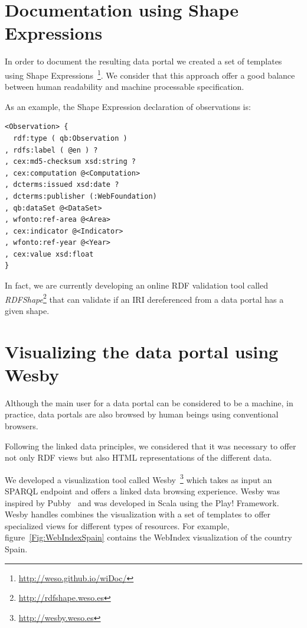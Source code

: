 \documentclass{acm_proc_article-sp}
\begin{document}
\section{Documentation using Shape Expressions}

In order to document the resulting data portal we created a set of templates using Shape Expressions~\footnote{\url{http://weso.github.io/wiDoc/}}. We consider that this approach offer a good balance between human readability and machine processable specification. 

As an example, the Shape Expression declaration of observations is:

\begin{lstlisting}
<Observation> { 
  rdf:type ( qb:Observation )  
, rdfs:label ( @en ) ?
, cex:md5-checksum xsd:string ?
, cex:computation @<Computation> 
, dcterms:issued xsd:date ?
, dcterms:publisher (:WebFoundation) 
, qb:dataSet @<DataSet>
, wfonto:ref-area @<Area>
, cex:indicator @<Indicator> 
, wfonto:ref-year @<Year>
, cex:value xsd:float              
}
\end{lstlisting}

In fact, we are currently developing an online RDF validation tool called \emph{RDFShape}\footnote{\url{http://rdfshape.weso.es}} that can validate if an IRI dereferenced from a data portal has a given shape.

\section{Visualizing the data portal using Wesby}

Although the main user for a data portal can be considered to be a machine, in practice, data portals are also browsed by human beings using conventional browsers. 

Following the linked data principles, we considered that it was necessary to offer not only RDF views but also HTML representations of the different data.

We developed a visualization tool called Wesby~\footnote{\url{http://wesby.weso.es}} which takes as input an SPARQL endpoint and offers a linked data browsing experience. Wesby was inspired by Pubby~\cite{Pubby} and was developed in Scala using the Play! Framework. 
Wesby handles combines the visualization with a set of templates to offer specialized views for different
 types of resources. For example, figure~\ref{Fig:WebIndexSpain} contains the WebIndex visualization of 
 the country Spain.
\end{document}
